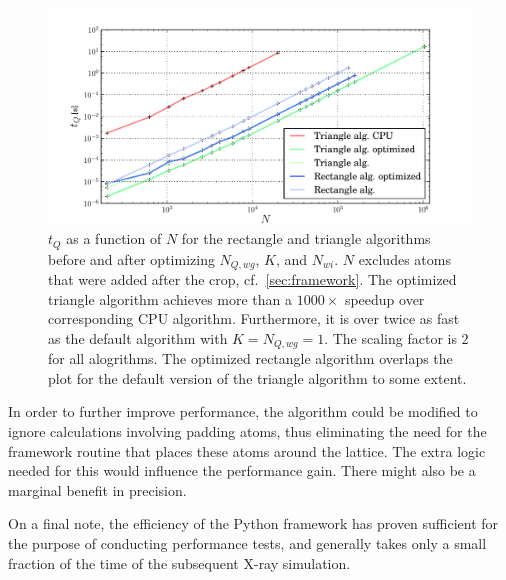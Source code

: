 \documentclass[11pt,twoside]{report}
\begin{document}
\begin{figure}[htbp]
	\begin{center}
		\includegraphics[width=\textwidth]{img/_N_t_supermegaplot.pdf}	
	\end{center}
	\caption{$t_{Q}$ as a function of $N$ for the rectangle and triangle algorithms before and after optimizing $N_{Q,wg}$, $K$, and $N_{wi}$. $N$ excludes atoms that were added after the crop, cf.~\cref{sec:framework}. The optimized triangle algorithm achieves more than a $1000\times$ speedup over corresponding CPU algorithm. Furthermore, it is over twice as fast as the default algorithm with $K = N_{Q,wg} = 1$. The scaling factor is $2$ for all alogrithms. The optimized rectangle algorithm overlaps the plot for the default version of the triangle algorithm to some extent.  \label{fig:theshit}}
\end{figure}


\indent In order to further improve performance, the algorithm could be modified to ignore calculations involving padding atoms, thus eliminating the need for the framework routine that places these atoms around the lattice. The extra logic needed for this would influence the performance gain. There might also be a marginal benefit in precision.

\indent On a final note, the efficiency of the Python framework has proven sufficient for the purpose of conducting performance tests, and generally takes only a small fraction of the time of the subsequent X-ray simulation.
\end{document}
